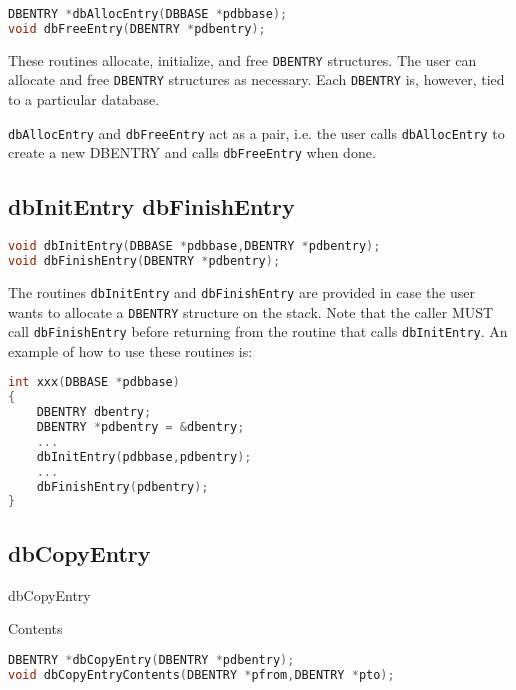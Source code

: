 \begin{lstlisting}[language=C]
DBENTRY *dbAllocEntry(DBBASE *pdbbase);
void dbFreeEntry(DBENTRY *pdbentry);
\end{lstlisting}

These routines allocate, initialize, and free \verb|DBENTRY| structures. The user can allocate and free \verb|DBENTRY| structures as 
necessary. Each \verb|DBENTRY| is, however, tied to a particular database.

\verb|dbAllocEntry| and \verb|dbFreeEntry| act as a pair, i.e. the user calls \verb|dbAllocEntry| to create a new DBENTRY and 
calls \verb|dbFreeEntry| when done.

\subsection{dbInitEntry dbFinishEntry}

\begin{lstlisting}[language=C]
void dbInitEntry(DBBASE *pdbbase,DBENTRY *pdbentry);
void dbFinishEntry(DBENTRY *pdbentry);
\end{lstlisting}

The routines \verb|dbInitEntry| and \verb|dbFinishEntry| are provided in case the user wants to allocate a \verb|DBENTRY| structure 
on the stack. Note that the caller MUST call \verb|dbFinishEntry| before returning from the routine that calls 
\verb|dbInitEntry|. An example of how to use these routines is:

\begin{lstlisting}[language=C]
int xxx(DBBASE *pdbbase)
{
    DBENTRY dbentry;
    DBENTRY *pdbentry = &dbentry;
    ...
    dbInitEntry(pdbbase,pdbentry);
    ...
    dbFinishEntry(pdbentry);
}

\end{lstlisting}

\subsection{dbCopyEntry}

dbCopyEntry

Contents

\begin{lstlisting}[language=C]
DBENTRY *dbCopyEntry(DBENTRY *pdbentry);
void dbCopyEntryContents(DBENTRY *pfrom,DBENTRY *pto);
\end{lstlisting}

